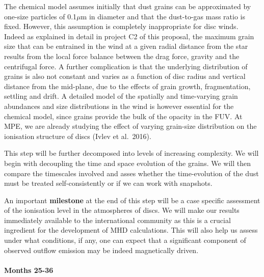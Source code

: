 \documentclass[10pt,fleqn,twoside]{article}
\begin{document}
 The chemical model assumes
initially that dust grains can be approximated by one-size particles
of 0.1${\mu}$m in diameter and that the dust-to-gas mass ratio is
fixed.  However, this assumption is completely inappropriate for disc
winds. Indeed as explained in detail in project C2 of this proposal,
the maximum grain size that can be entrained in the wind at a given
radial distance from the star results from the local force balance
between the drag force, gravity and the centrifugal force. A further
complication is that the underlying distribution of grains is also not
constant and varies as a function of disc radius and vertical distance
from the mid-plane, due to the effects of grain growth, fragmentation,
settling and drift. A detailed model of the spatially and time-varying
grain abundances and size distributions in the wind is however
essential for the chemical model, since grains provide the bulk of the
opacity in the FUV.   At MPE, we are
already studying the effect of varying grain-size distribution on the
ionisation structure of discs (Ivlev et al.\ 2016).  

This step will be further decomposed into levels of increasing
complexity. We will begin with decoupling the time and space evolution
of the grains. We will then compare the timescales involved and asses
whether the time-evolution of the dust must be treated
self-consistently or if we can work with snapshots.  

An important {\bf milestone} at the end of this step will be a case
specific assessment of the ionisation level in the atmospheres of
discs.   We will make our results immediately available to the international
community as this is a crucial ingredient for the development of MHD
calculations. This will also help us assess under what conditions, if
any, one can expect that a significant component of observed outflow
emission may be indeed magnetically driven.

\paragraph{ Months 25-36}
\end{document}
